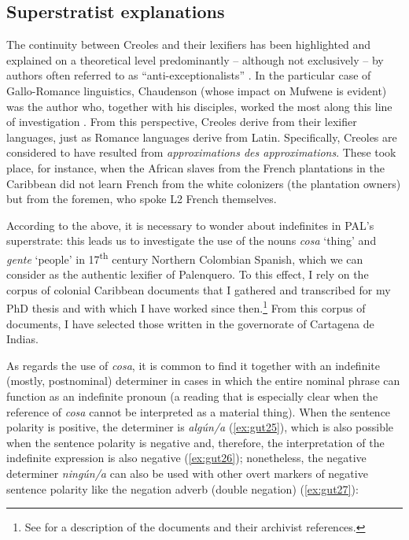\documentclass[output=paper,colorlinks,citecolor=brown]{langscibook}
\begin{document}
\subsection{Superstratist explanations}\label{sec:gut3.2}

The continuity between Creoles and their lexifiers has been highlighted and explained on a theoretical level predominantly -- although not exclusively -- by authors often referred to as “anti-exceptionalists” \citep[cf.][]{Mufwene2001}. In the particular case of Gallo-Romance linguistics, Chaudenson (whose impact on Mufwene is evident) was the author who, together with his disciples, worked the most along this line of investigation \citep[cf.][]{Chaudenson1992, Chaudenson2003}. From this perspective, Creoles derive from their lexifier languages, just as Romance languages derive from Latin. Specifically, Creoles are considered to have resulted from \textit{approximations des approximations}. These took place, for instance, when the African slaves from the French plantations in the Caribbean did not learn French from the white colonizers (the plantation owners) but from the foremen, who spoke L2 French themselves.

According to the above, it is necessary to wonder about indefinites in PAL’s superstrate: this leads us to investigate the use of the nouns \textit{cosa} ‘thing’ and \textit{gente} ‘people’ in 17\textsuperscript{th} century Northern Colombian Spanish, which we can consider as the authentic lexifier of Palenquero. To this effect, I rely on the corpus of colonial Caribbean documents that I gathered and transcribed for my PhD thesis and with which I have worked since then.\footnote{See \citet[][431--442]{GutiérrezMaté2013} for a description of the documents and their archivist references.} From this corpus of documents, I have selected those written in the governorate of Cartagena de Indias.

As regards the use of \textit{cosa}, it is common to find it together with an indefinite (mostly, postnominal) determiner in cases in which the entire nominal phrase can function as an indefinite pronoun (a reading that is especially clear when the reference of \textit{cosa} cannot be interpreted as a material thing). When the sentence polarity is positive, the determiner is \textit{algún/a} (\ref{ex:gut25}), which is also possible when the sentence polarity is negative and, therefore, the interpretation of the indefinite expression is also negative (\ref{ex:gut26}); nonetheless, the negative determiner \textit{ningún/a} can also be used with other overt markers of negative sentence polarity like the negation adverb (double negation) (\ref{ex:gut27}):
\end{document}
